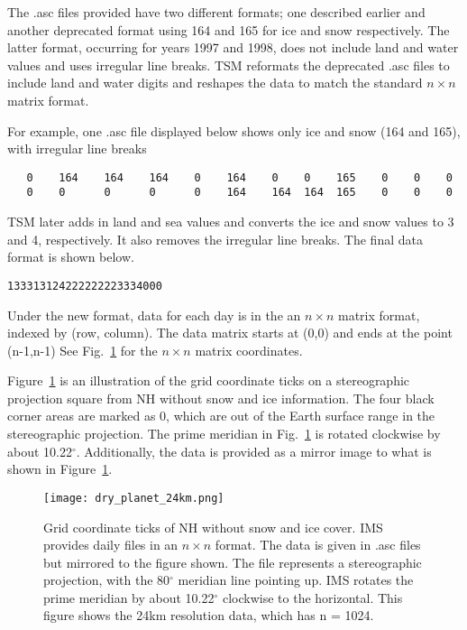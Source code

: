 The .asc files provided have two different formats; one described earlier and another deprecated format using 164 and 165 for ice and snow respectively. The latter format, occurring for years 1997 and 1998, does not include land and water values and uses irregular line breaks. TSM reformats the deprecated .asc files to include land and water digits and reshapes the data to match the standard $n \times n$ matrix format. 

For example, one .asc file displayed below shows only ice and snow (164 and 165), with irregular line breaks
\begin{verbatim}
   0    164    164    164    0    164    0    0    165    0    0    0  
   0    0      0      0      0    164    164  164  165    0    0    0  
\end{verbatim}
TSM later adds in land and sea values and converts the ice and snow values to 3 and 4, respectively. It also removes the irregular line breaks. The final data format is  shown below.
\begin{verbatim}
133313124222222223334000
\end{verbatim}
Under the new format, data for each day is in the an $n\times n$ matrix format, indexed by (row, column). The data matrix starts at (0,0) and ends at the point (n-1,n-1) See Fig.~\ref{fig:dry earth} for the $n\times n$ matrix coordinates.

Figure~\ref{fig:dry earth} is an illustration of the grid coordinate ticks on a stereographic projection square from NH without snow and ice information. The four black corner areas are marked as 0, which are out of the Earth surface range in the stereographic projection. The prime meridian in Fig.~\ref{fig:dry earth} is rotated clockwise by about 10.22$^{\circ}$. Additionally, the data is provided as a mirror image to what is shown in Figure~\ref{fig:dry earth}.
\begin{figure}[ht]
\centering
\begin{minipage}{4.0in}
\texttt{[image: dry\_planet\_24km.png]}
\caption{Grid coordinate ticks of NH without snow and ice cover. IMS provides daily files in an $n \times n$ format. The data is given in .asc files but mirrored to the figure shown. The file represents a stereographic projection, with the 80$^{\circ}$ meridian line pointing up. IMS rotates the prime meridian by about 10.22$^{\circ}$ clockwise to the horizontal. This figure shows the 24km resolution data, which has n = 1024.}
\label{fig:dry earth}
\end{minipage}
\end{figure}


